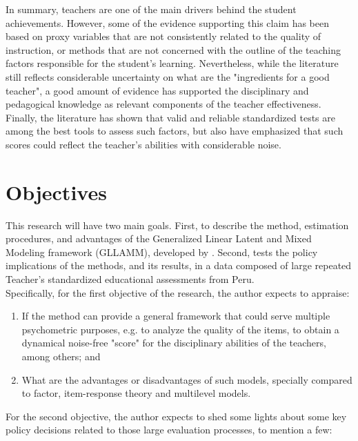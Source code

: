 In summary, teachers are one of the main drivers behind the student achievements. However, some of the evidence supporting this claim has been based on proxy variables that are not consistently related to the quality of instruction, or methods that are not concerned with the outline of the teaching factors responsible for the student's learning. Nevertheless, while the literature still reflects considerable uncertainty on what are the "ingredients for a good teacher", a good amount of evidence has supported the disciplinary and pedagogical knowledge as relevant components of the teacher effectiveness. Finally, the literature has shown that valid and reliable standardized tests are among the best tools to assess such factors, but also have emphasized that such scores could reflect the teacher's abilities with considerable noise.

\section{Objectives}

This research will have two main goals. First, to describe the method, estimation procedures, and advantages of the Generalized Linear Latent and Mixed Modeling framework (GLLAMM), developed by \citet{Rabe_et_al_2004a, Rabe_et_al_2004b, Skrondal_et_al_2004a, Rabe_et_al_2012}. Second, tests the policy implications of the methods, and its results, in a data composed of large repeated Teacher's standardized educational assessments from Peru. \\

\noindent Specifically, for the first objective of the research, the author expects to appraise: 

\begin{enumerate}
	\item If the method can provide a general framework that could serve multiple psychometric purposes, e.g. to analyze the quality of the items, to obtain a dynamical noise-free "score" for the disciplinary abilities of the teachers, among others; and
	
	\item What are the advantages or disadvantages of such models, specially compared to factor, item-response theory and multilevel models.
\end{enumerate}

\noindent For the second objective, the author expects to shed some lights about some key policy decisions related to those large evaluation processes, to mention a few:

